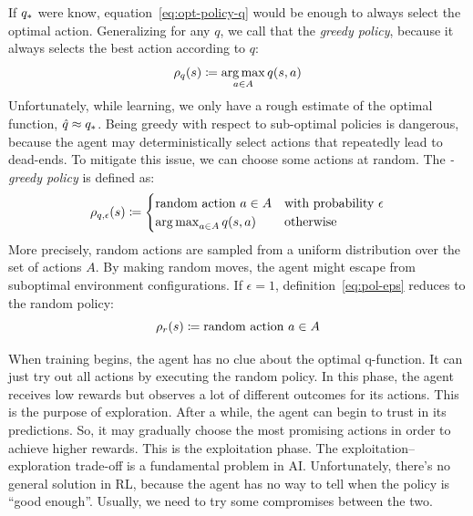 If ${q}_*$ were know, equation~\eqref{eq:opt-policy-q} would be enough
to always select the optimal action. Generalizing for any $q$, we call that
the \emph{greedy policy}, because it always selects the best action according
to $q$:
\begin{equation}
	\rho_q(s) \coloneqq \operatorname*{arg\,max}_{a \in A} q(s, a)
	\label{eq:pol-greedy}
\end{equation}
Unfortunately, while learning, we only have a rough estimate of the optimal
function, ${\hat{q} \approx {q}_*}$. Being greedy with respect to
sub-optimal policies is dangerous, because the agent may deterministically
select actions that repeatedly lead to dead-ends.  To mitigate this issue, we
can choose some actions at random. The \emph{\eps-greedy policy} is defined
as:
\enlargethispage{1\baselineskip}
\begin{equation}
	\rho_{q,\epsilon}(s) \coloneqq
	\begin{cases}
		\text{random action $a \in A$}
		&\text{with probability $\epsilon$} \\
		\operatorname*{arg\,max}_{a \in A} q(s, a)
		&\text{otherwise}
	\end{cases}
	\label{eq:pol-eps}
\end{equation}
More precisely, random actions are sampled from a uniform distribution over
the set of actions $A$. By making random moves, the agent might escape from
suboptimal environment configurations. If $\epsilon = 1$,
definition~\eqref{eq:pol-eps} reduces to the random policy:
\begin{equation}
	\rho_r(s) \coloneqq \text{random action $a \in A$}
	\label{eq:pol-random}
\end{equation}

When training begins, the agent has no clue about the optimal q-function. It
can just try out all actions by executing the random policy. In this phase,
the agent receives low rewards but observes a lot of different outcomes for
its actions. This is the purpose of exploration. After a while, the agent can
begin to trust in its predictions. So, it may gradually choose the most
promising actions in order to achieve higher rewards. This is the exploitation
phase.  The exploitation--exploration trade-off is a fundamental problem in
AI.  Unfortunately, there's no general solution in RL, because the agent has
no way to tell when the policy is ``good enough''. Usually, we need to try
some compromises between the two.

